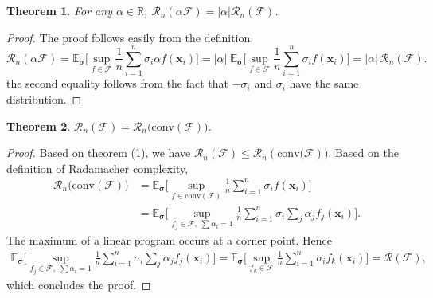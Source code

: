 \documentclass[]{article}
\newtheorem{theorem}{Theorem}
\newcommand{\bx}{\mathbf{x}}
\newcommand{\bsigma}{{\boldsymbol{\sigma}}}
\newcommand{\cF}{\mathcal{F}}
\newcommand{\Rad}{\mathcal{R}}
\newcommand{\R}{\mathbb{R}}
\newcommand{\E}{\mathbb{E}}
\begin{document}
	\begin{theorem}
		For any $\alpha \in \R$, $	
		\mathcal{R}_n(\alpha\mathcal{F}) = |\alpha| \mathcal{R}_n(\mathcal{F})$.
	\end{theorem}
	\begin{proof}
		The proof follows easily from the definition
		\begin{equation*}
		\Rad_n(\alpha\cF) = \E_\bsigma\Big[\sup_{f\in\cF}\frac{1}{n}\sum_{i = 1}^{n}\sigma_i \alpha f(\bx_i)\Big] = |\alpha|\;\E_\bsigma\Big[\sup_{f\in\cF}\frac{1}{n}\sum_{i = 1}^{n}\sigma_i  f(\bx_i)\Big] = |\alpha|\,\Rad_n(\cF).
		\end{equation*}
		the second equality follows from the fact that $-\sigma_i$ and $\sigma_i$ have the same distribution.
	\end{proof}
	
	\begin{theorem}
		$\mathcal{R}_n(\mathcal{F}) = \mathcal{R}_n\Big(\mathrm{conv}(\mathcal{F})\Big)$.
	\end{theorem}	
	\begin{proof}
		Based on theorem (1), we have 
		$\Rad_n(\cF) \leq \Rad_n(\mathrm{conv}\big(\cF)\big)$.
		Based on the definition of Radamacher complexity,
		\begin{align*}
		\mathcal{R}_n\Big(\mathrm{conv}(\mathcal{F})\Big) &= \E_\bsigma\Big[\sup_{f\in\mathrm{conv}(\cF)}\frac{1}{n}\sum_{i = 1}^{n}\sigma_i  f(\bx_i)\Big]\\
		&=\E_\bsigma\Big[\sup_{f_j\in\cF,\; \sum\alpha_i = 1}\frac{1}{n}\sum_{i = 1}^{n}\sigma_i  \sum_{j} \alpha_j f_j(\bx_i)\Big].
		\end{align*}
		The maximum of a linear program occurs at a corner point. Hence
		\begin{align*}
		\E_\bsigma\Big[\sup_{f_j\in\cF,\; \sum\alpha_i = 1}\frac{1}{n}\sum_{i = 1}^{n}\sigma_i  \sum_{j} \alpha_j f_j(\bx_i)\Big] = \E_\bsigma\Big[\sup_{f_k\in\cF}\frac{1}{n}\sum_{i = 1}^{n}\sigma_i f_k(\bx_i)\Big] = \Rad(\cF),
		\end{align*}
		which concludes the proof.
	\end{proof}
	
\end{document}
